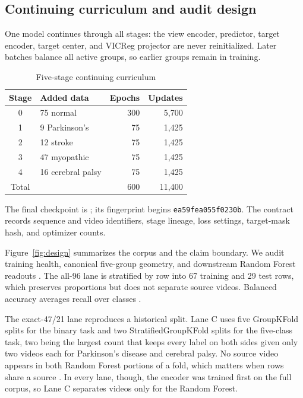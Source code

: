 \documentclass[conference]{IEEEtran}
\begin{document}
\subsection{Continuing curriculum and audit design}
One model continues through all stages: the view encoder, predictor, target encoder, target center, and VICReg projector are never reinitialized. Later batches balance all active groups, so earlier groups remain in training.

\begin{table}[t]
\caption{Five-stage continuing curriculum}
\label{tab:curriculum}
\centering
\small
\begin{tabular}{clrr}
\toprule
Stage & Added data & Epochs & Updates \\
\midrule
0 & 75 normal & 300 & 5,700 \\
1 & 9 Parkinson's & 75 & 1,425 \\
2 & 12 stroke & 75 & 1,425 \\
3 & 47 myopathic & 75 & 1,425 \\
4 & 16 cerebral palsy & 75 & 1,425 \\
\midrule
Total & & 600 & 11,400 \\
\bottomrule
\end{tabular}
\end{table}

The final checkpoint is ; its fingerprint begins \texttt{ea59fea055f0230b}. The contract records sequence and video identifiers, stage lineage, loss settings, target-mask hash, and optimizer counts.

Figure~\ref{fig:design} summarizes the corpus and the claim boundary. We audit training health, canonical five-group geometry, and downstream Random Forest readouts \cite{breiman2001randomforests,pedregosa2011scikit}. The all-96 lane is stratified by row into 67 training and 29 test rows, which preserves proportions but does not separate source videos. Balanced accuracy averages recall over classes \cite{brodersen2010balanced}.

The exact-47/21 lane reproduces a historical split. Lane C uses five GroupKFold splits for the binary task and two StratifiedGroupKFold splits for the five-class task, two being the largest count that keeps every label on both sides given only two videos each for Parkinson's disease and cerebral palsy. No source video appears in both Random Forest portions of a fold, which matters when rows share a source \cite{roberts2017crossvalidation}. In every lane, though, the encoder was trained first on the full corpus, so Lane C separates videos only for the Random Forest.
\end{document}
